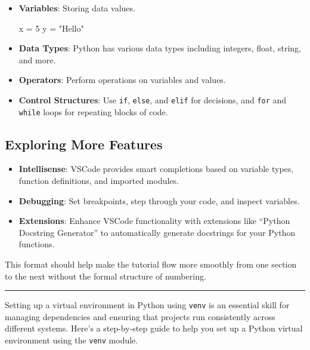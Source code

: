 \documentclass[
  letterpaper,
  DIV=11,
  numbers=noendperiod]{scrreprt}
\newenvironment{Shaded}{\begin{snugshade}}{\end{snugshade}}
\newcommand{\DecValTok}[1]{\textcolor[rgb]{0.68,0.00,0.00}{#1}}
\newcommand{\NormalTok}[1]{\textcolor[rgb]{0.00,0.23,0.31}{#1}}
\newcommand{\OperatorTok}[1]{\textcolor[rgb]{0.37,0.37,0.37}{#1}}
\newcommand{\StringTok}[1]{\textcolor[rgb]{0.13,0.47,0.30}{#1}}
\providecommand{\tightlist}{%
  \setlength{\itemsep}{0pt}\setlength{\parskip}{0pt}}\usepackage{longtable,booktabs,array}
\begin{document}
\begin{itemize}
\item
  \textbf{Variables}: Storing data values.

\begin{Shaded}
\begin{Highlighting}[]
\NormalTok{x }\OperatorTok{=} \DecValTok{5}
\NormalTok{y }\OperatorTok{=} \StringTok{"Hello"}
\end{Highlighting}
\end{Shaded}
\item
  \textbf{Data Types}: Python has various data types including integers,
  float, string, and more.
\item
  \textbf{Operators}: Perform operations on variables and values.
\item
  \textbf{Control Structures}: Use \texttt{if}, \texttt{else}, and
  \texttt{elif} for decisions, and \texttt{for} and \texttt{while} loops
  for repeating blocks of code.
\end{itemize}

\subsection{Exploring More Features}\label{exploring-more-features}

\begin{itemize}
\tightlist
\item
  \textbf{Intellisense}: VSCode provides smart completions based on
  variable types, function definitions, and imported modules.
\item
  \textbf{Debugging}: Set breakpoints, step through your code, and
  inspect variables.
\item
  \textbf{Extensions}: Enhance VSCode functionality with extensions like
  ``Python Docstring Generator'' to automatically generate docstrings
  for your Python functions.
\end{itemize}

This format should help make the tutorial flow more smoothly from one
section to the next without the formal structure of numbering.

\begin{center}\rule{0.5\linewidth}{0.5pt}\end{center}

Setting up a virtual environment in Python using \texttt{venv} is an
essential skill for managing dependencies and ensuring that projects run
consistently across different systems. Here's a step-by-step guide to
help you set up a Python virtual environment using the \texttt{venv}
module.
\end{document}
